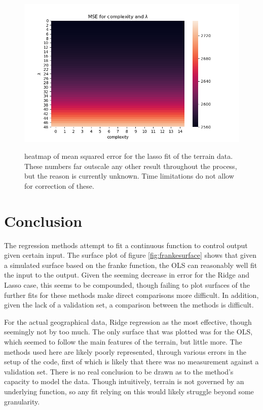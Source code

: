 \documentclass[ 12pt, a4paper ]{article}
\begin{document}
\begin{figure}[H]
\includegraphics[scale=0.7]{nordatalassomseheatmap.png}
\label{fig:nordatalassomseheatmap}
\caption{
    heatmap of mean squared error for the lasso fit of the terrain data. These numbers far 
    outscale any other result throughout the process, but the reason is currently unknown. 
    Time limitations do not allow for correction of these. 
}
\end{figure}



\section{Conclusion}

The regression methods attempt to fit a continuous function to control output given certain
input. The surface plot of figure \ref{fig:frankesurface} shows that given a simulated surface
based on the franke function, the OLS can reasonably well fit the input to the output. Given the
seeming decrease in error for the Ridge and Lasso case, this seems to be compounded, though
failing to plot surfaces of the further fits for these methods make direct comparisons more
difficult. In addition, given the lack of a validation set, a comparison between the methods
is difficult. 

For the actual geographical data, Ridge regression as the most effective, though seemingly not 
by too much.  The only surface that was plotted was for the OLS, which seemed to follow the 
main features of the terrain, but little more. The methods used here are likely poorly 
represented, through various errors in the setup of the code, first of which is likely that 
there was no measurement against a validation set. There is no real conclusion to be drawn as to 
the method's capacity to model the data. Though intuitively, terrain is not governed by an 
underlying function, so any fit relying on this would likely struggle beyond some granularity. 
\end{document}
